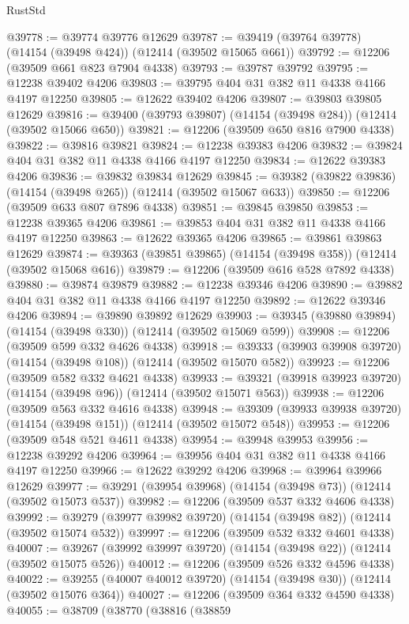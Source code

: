 \begin{lexlean}{RustStd}
\begin{coremodule}
@39778 := @39774 @39776 @12629
@39787 := @39419 (@39764 @39778) (@14154 (@39498 @424)) (@12414 (@39502 @15065 @661))
@39792 := @12206 (@39509 @661 @823 @7904 @4338)
@39793 := @39787 @39792
@39795 := @12238 @39402 @4206
@39803 := @39795 @404 @31 @382 @11 @4338 @4166 @4197 @12250
@39805 := @12622 @39402 @4206
@39807 := @39803 @39805 @12629
@39816 := @39400 (@39793 @39807) (@14154 (@39498 @284)) (@12414 (@39502 @15066 @650))
@39821 := @12206 (@39509 @650 @816 @7900 @4338)
@39822 := @39816 @39821
@39824 := @12238 @39383 @4206
@39832 := @39824 @404 @31 @382 @11 @4338 @4166 @4197 @12250
@39834 := @12622 @39383 @4206
@39836 := @39832 @39834 @12629
@39845 := @39382 (@39822 @39836) (@14154 (@39498 @265)) (@12414 (@39502 @15067 @633))
@39850 := @12206 (@39509 @633 @807 @7896 @4338)
@39851 := @39845 @39850
@39853 := @12238 @39365 @4206
@39861 := @39853 @404 @31 @382 @11 @4338 @4166 @4197 @12250
@39863 := @12622 @39365 @4206
@39865 := @39861 @39863 @12629
@39874 := @39363 (@39851 @39865) (@14154 (@39498 @358)) (@12414 (@39502 @15068 @616))
@39879 := @12206 (@39509 @616 @528 @7892 @4338)
@39880 := @39874 @39879
@39882 := @12238 @39346 @4206
@39890 := @39882 @404 @31 @382 @11 @4338 @4166 @4197 @12250
@39892 := @12622 @39346 @4206
@39894 := @39890 @39892 @12629
@39903 := @39345 (@39880 @39894) (@14154 (@39498 @330)) (@12414 (@39502 @15069 @599))
@39908 := @12206 (@39509 @599 @332 @4626 @4338)
@39918 := @39333 (@39903 @39908 @39720) (@14154 (@39498 @108)) (@12414 (@39502 @15070 @582))
@39923 := @12206 (@39509 @582 @332 @4621 @4338)
@39933 := @39321 (@39918 @39923 @39720) (@14154 (@39498 @96)) (@12414 (@39502 @15071 @563))
@39938 := @12206 (@39509 @563 @332 @4616 @4338)
@39948 := @39309 (@39933 @39938 @39720) (@14154 (@39498 @151)) (@12414 (@39502 @15072 @548))
@39953 := @12206 (@39509 @548 @521 @4611 @4338)
@39954 := @39948 @39953
@39956 := @12238 @39292 @4206
@39964 := @39956 @404 @31 @382 @11 @4338 @4166 @4197 @12250
@39966 := @12622 @39292 @4206
@39968 := @39964 @39966 @12629
@39977 := @39291 (@39954 @39968) (@14154 (@39498 @73)) (@12414 (@39502 @15073 @537))
@39982 := @12206 (@39509 @537 @332 @4606 @4338)
@39992 := @39279 (@39977 @39982 @39720) (@14154 (@39498 @82)) (@12414 (@39502 @15074 @532))
@39997 := @12206 (@39509 @532 @332 @4601 @4338)
@40007 := @39267 (@39992 @39997 @39720) (@14154 (@39498 @22)) (@12414 (@39502 @15075 @526))
@40012 := @12206 (@39509 @526 @332 @4596 @4338)
@40022 := @39255 (@40007 @40012 @39720) (@14154 (@39498 @30)) (@12414 (@39502 @15076 @364))
@40027 := @12206 (@39509 @364 @332 @4590 @4338)
@40055 := @38709
    (@38770
      (@38816
        (@38859

\end{coremodule}
\end{lexlean}
